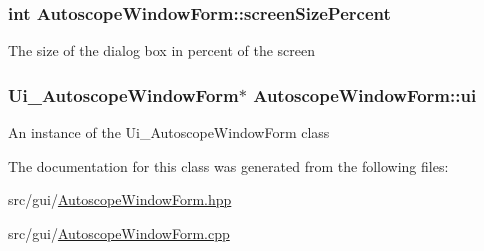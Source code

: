 \subsubsection[{\texorpdfstring{screen\+Size\+Percent}{screenSizePercent}}]{\setlength{\rightskip}{0pt plus 5cm}int Autoscope\+Window\+Form\+::screen\+Size\+Percent\hspace{0.3cm}{\ttfamily [private]}}\hypertarget{class_autoscope_window_form_a4e436f5aca95b4d503ae9c5fe28ec8ed}{}\label{class_autoscope_window_form_a4e436f5aca95b4d503ae9c5fe28ec8ed}
The size of the dialog box in percent of the screen 
\subsubsection[{\texorpdfstring{ui}{ui}}]{\setlength{\rightskip}{0pt plus 5cm}Ui\+\_\+\+Autoscope\+Window\+Form$\ast$ Autoscope\+Window\+Form\+::ui\hspace{0.3cm}{\ttfamily [private]}}\hypertarget{class_autoscope_window_form_a9a937e00b0a9a4d16001b5da7449a07f}{}\label{class_autoscope_window_form_a9a937e00b0a9a4d16001b5da7449a07f}
An instance of the Ui\+\_\+\+Autoscope\+Window\+Form class 

The documentation for this class was generated from the following files\+:\begin{DoxyCompactItemize}
\item 
src/gui/\hyperlink{_autoscope_window_form_8hpp}{Autoscope\+Window\+Form.\+hpp}\item 
src/gui/\hyperlink{_autoscope_window_form_8cpp}{Autoscope\+Window\+Form.\+cpp}\end{DoxyCompactItemize}
